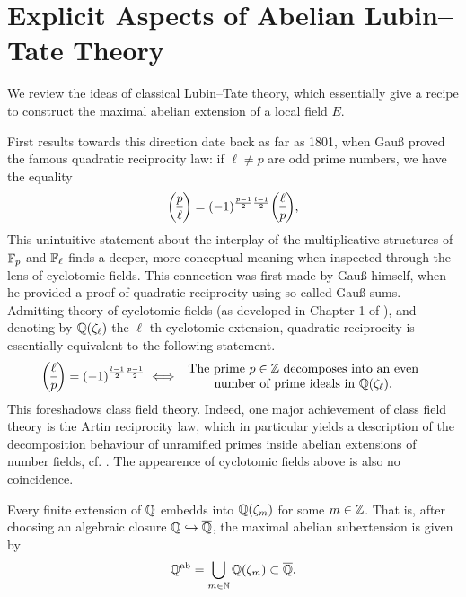 \documentclass[../main.tex]{subfiles}
\begin{document}
\section{Explicit Aspects of Abelian Lubin--Tate Theory} %
\label{sec:Local Class Field Theory}
We review the ideas of classical Lubin--Tate theory, which essentially give 
a recipe to construct the maximal abelian extension of a local field $E$. 

First results towards this direction date back as far as 1801, when 
Gauß proved the famous quadratic reciprocity law: if $\ell \neq p$ are odd 
prime numbers, we have the equality
\begin{equation*}
  \legendre p \ell = (-1)^{\frac{p-1}2 \frac{l-1}2} \legendre \ell p,
\end{equation*}
This unintuitive statement about the interplay of the multiplicative structures of
$\mathbb{F}_p$ and $\mathbb{F}_\ell$ finds a deeper, more conceptual meaning when inspected through
the lens of cyclotomic fields. This connection
was first made by Gauß himself, when he provided a proof of quadratic
reciprocity using so-called Gauß sums. Admitting theory of cyclotomic fields 
(as developed in Chapter 1 of \cite{neukirch2006algebraische}), and denoting by
$\mathbb{Q}(\zeta_\ell)$ the $\ell$-th cyclotomic extension,
quadratic reciprocity is essentially equivalent to the following statement.
\begin{equation*}
  \legendre \ell p = (-1)^{\frac{l-1}2 \frac{p-1}2} \iff \begin{array}c
    \text{The prime $p \in \Z$
    decomposes into an even} \\ \text{number of prime ideals in
  $\Q(\zeta_\ell)$.} \end{array}
\end{equation*}
This foreshadows class field theory. Indeed, one major achievement
of class field theory is the Artin reciprocity law, which in particular yields a 
description of the decomposition behaviour of unramified primes inside abelian extensions
of number fields, cf. \cite[Theorem 7.3]{neukirch2006algebraische}. 
The appearence of cyclotomic fields above is also no coincidence.

\begin{thm} \label{thm:KroneckerWeber}
  Every finite extension of $\mathbb{Q}$ embedds into $\mathbb{Q}(\zeta_m)$ for some $m \in \mathbb{Z}$.
  That is, after choosing an algebraic closure $\mathbb{Q} \hookrightarrow \overline {\mathbb{Q}}$, the maximal abelian
  subextension is given by 
  \begin{equation*}
    \mathbb{Q}^{\mathrm{ab}} = \bigcup_{m \in \mathbb{N}} \mathbb{Q}(\zeta_m) \subset \overline {\mathbb{Q}}.
  \end{equation*}
\end{thm}
\end{document}
